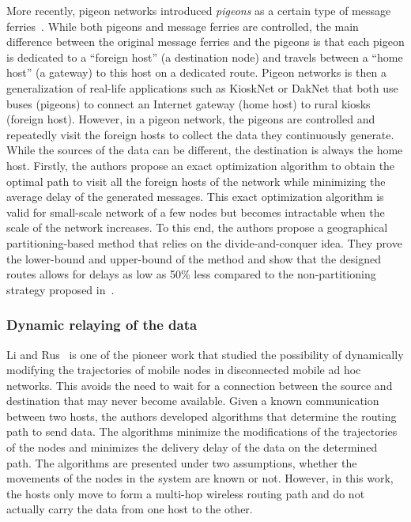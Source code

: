 More recently, pigeon networks introduced \textit{pigeons} as a certain type of message ferries~\cite{zhou2013minimizing}. While both pigeons and message ferries are controlled, the main difference between the original message ferries and the pigeons is that each pigeon is dedicated to a ``foreign host'' (\ie a destination node) and travels between a ``home host'' (\ie a gateway) to this host on a dedicated route. Pigeon networks is then a generalization of real-life applications such as KioskNet or DakNet that both use buses (pigeons) to connect an Internet gateway (home host) to rural kiosks (foreign host). However, in a pigeon network, the pigeons are controlled and repeatedly visit the foreign hosts to collect the data they continuously generate. While the sources of the data can be different, the destination is always the home host. Firstly, the authors propose an exact optimization algorithm to obtain the optimal path to visit all the foreign hosts of the network while minimizing the average delay of the generated messages. This exact optimization algorithm is valid for small-scale network of a few nodes but becomes intractable when the scale of the network increases. To this end, the authors propose a geographical partitioning-based method that relies on the divide-and-conquer idea. They prove the lower-bound and upper-bound of the method and show that the designed routes allows for delays as low as 50\% less compared to the non-partitioning strategy proposed in~\cite{zhao2005controlling}. 

\subsubsection{Dynamic relaying of the data}


Li and Rus~\cite{li2000sending} is one of the pioneer work that studied the possibility of dynamically modifying the trajectories of mobile nodes in disconnected mobile ad hoc networks. This avoids the need to wait for a connection between the source and destination that may never become available. Given a known communication between two hosts, the authors developed algorithms that determine the routing path to send data. The algorithms minimize the modifications of the trajectories of the nodes and minimizes the delivery delay of the data on the determined path. The algorithms are presented under two assumptions, whether the movements of the nodes in the system are known or not. However, in this work, the hosts only move to form a multi-hop wireless routing path and do not actually carry the data from one host to the other. 

